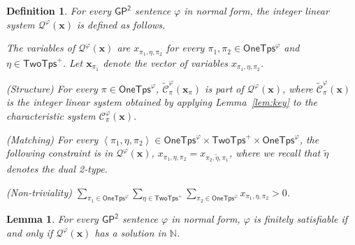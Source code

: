 \documentclass[10pt,a4paper]{article}
\newtheorem{lemma}[theorem]{Lemma}
\newtheorem{definition}[theorem]{Definition}
\theoremstyle{definition}
\theoremstyle{remark}
\newcommand{\cC}{\mathcal{C}}
\newcommand{\cCtilde}{\tilde{\mathcal{C}}}
\newcommand{\cQ}{\mathcal{Q}}
\newcommand{\bbN}{\mathbb{N}}
\newcommand{\bfx}{\mathbf{x}}
\newcommand{\twotypes}{\mathsf{TwoTps}}
\newcommand{\Onetypes}{\mathsf{OneTps}}
\newcommand{\GPtwo}   {\mathsf{GP^2}}
\newcommand{\tuple}[1]       {\left\langle #1 \right\rangle}
\newcommand{\dual}[1] {\widetilde{ #1 }}
\begin{document}
\begin{definition}
\label{def:linear-system-Q}
    For every $\GPtwo$ sentence $\varphi$ in normal form,
    the integer linear system $\cQ^\varphi(\bfx)$ is defined as follows.
    \begin{compactitem}
        \item The variables of $\cQ^\varphi(\bfx)$ are $x_{\pi_1, \eta, \pi_2}$
        for every $\pi_1, \pi_2 \in \Onetypes^\varphi$ and $\eta \in \twotypes^+$.
        Let $\bfx_{\pi_1}$ denote the vector of variables $x_{\pi_1, \eta, \pi_2}$.
        
        \item (Structure)
        For every $\pi \in \Onetypes^\varphi$,
        $\cCtilde^\varphi_\pi(\bfx_\pi)$
        is part of $\cQ^\varphi(\bfx)$,
        where $\cCtilde^\varphi_\pi(\bfx)$ is the integer linear system obtained by applying Lemma~\ref{lem:key} to the characteristic system $\cC^\varphi_\pi(\bfx)$.
            
        \item (Matching)
        For every $\tuple{\pi_1, \eta, \pi_2} \in \Onetypes^\varphi \times \twotypes^+ \times \Onetypes^\varphi$,
        the following constraint is in $\cQ^\varphi(\bfx)$,
        $x_{\pi_1, \eta, \pi_2} = x_{\pi_2, \dual{\eta}, \pi_1}$,
        where we recall that $\dual{\eta}$ denotes the dual 2-type.

        \item (Non-triviality)
            $\sum_{\pi_1 \in \Onetypes^\varphi}
            \sum_{\eta \in \twotypes^+}
            \sum_{\pi_2 \in \Onetypes^\varphi} x_{\pi_1, \eta, \pi_2}
             > 0$.
    \end{compactitem}
\end{definition}


\begin{lemma}\label{lem:equiv2}
    For every $\GPtwo$ sentence $\varphi$ in normal form,
    $\varphi$ is finitely satisfiable if and only if
    $\cQ^\varphi(\bfx)$ has a solution in $\bbN$.
\end{lemma}
\end{document}
